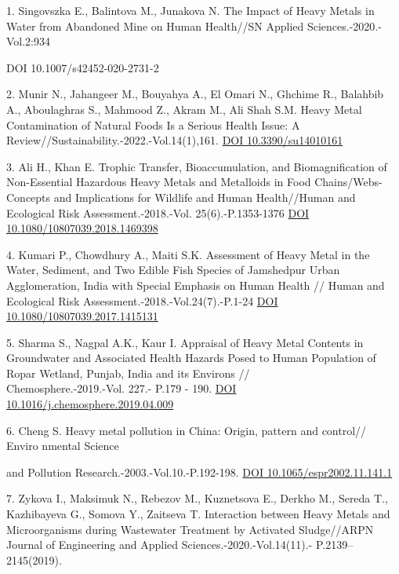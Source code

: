 \begin{references}
1. Singovszka E., Balintova M., Junakova N. The Impact of Heavy
Metals in Water from Abandoned Mine on Human Health//SN Applied
Sciences.-2020.-Vol.2:934

 DOI 10.1007/s42452-020-2731-2

2. Munir N., Jahangeer M., Bouyahya A., El Omari N., Ghchime R.,
Balahbib A., Aboulaghras S., Mahmood Z., Akram M., Ali Shah S.M.
Heavy Metal Contamination of Natural Foods Is a Serious Health
Issue: A Review//Sustainability.-2022.-Vol.14(1),161.
\href{https://doi.org/10.3390/su14010161}{DOI 10.3390/su14010161}

3. Ali H., Khan E. Trophic Transfer, Bioaccumulation, and
Biomagnification of Non-Essential Hazardous Heavy Metals and
Metalloids in Food Chains/Webs-Concepts and Implications for
Wildlife and Human Health//Human and Ecological Risk
Assessment.-2018.-Vol. 25(6).-P.1353-1376
\href{https://doi.org/10.1080/10807039.2018.1469398}{DOI\\
10.1080/10807039.2018.1469398}

4. Kumari P., Chowdhury A., Maiti S.K. Assessment of Heavy Metal
in the Water, Sediment, and Two Edible Fish Species of
Jamshedpur Urban Agglomeration, India with Special Emphasis on
Human Health // Human and Ecological Risk
Assessment.-2018.-Vol.24(7).-P.1-24
\href{https://doi.org/10.1080/10807039.2017.1415131}{DOI\\
10.1080/10807039.2017.1415131}

5. Sharma S., Nagpal A.K., Kaur I. Appraisal of Heavy Metal
Contents in Groundwater and Associated Health Hazards Posed to
Human Population of Ropar Wetland, Punjab, India and its
Environs // \\Chemosphere.-2019.-Vol. 227.- P.179 - 190.
\href{https://doi.org/10.1016/j.chemosphere.2019.04.009}{DOI
10.1016/j.chemosphere.2019.04.009}

6. Cheng S. Heavy metal pollution in China: Origin, pattern and
control// Enviro nmental Science

and Pollution Research.-2003.-Vol.10.-P.192-198.
\href{https://doi.org/10.1065/espr2002.11.141.1}{DOI
10.1065/espr2002.11.141.1}

7. Zykova I., Maksimuk N., Rebezov M., Kuznetsova E., Derkho M.,
Sereda T., Kazhibayeva G., Somova Y., Zaitseva T. Interaction
between Heavy Metals and Microorganisms during Wastewater
Treatment by Activated Sludge//ARPN Journal of Engineering and
Applied Sciences.-2020.-Vol.14(11).- P.2139--2145(2019).


\end{references}
